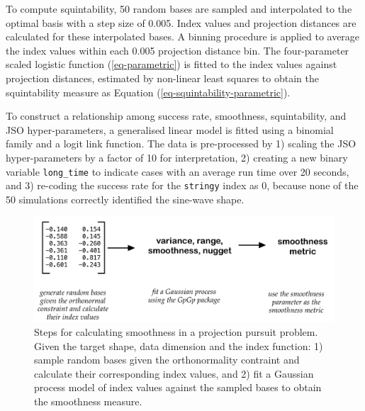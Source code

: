 \documentclass[
  12pt,
]{interact}
\theoremstyle{plain}
\begin{document}
To compute squintability, 50 random bases are sampled and interpolated
to the optimal basis with a step size of 0.005. Index values and
projection distances are calculated for these interpolated bases. A
binning procedure is applied to average the index values within each
0.005 projection distance bin. The four-parameter scaled logistic
function (\ref{eq-parametric}) is fitted to the index values against
projection distances, estimated by non-linear least squares to obtain
the squintability measure as Equation
(\ref{eq-squintability-parametric}).

To construct a relationship among success rate, smoothness,
squintability, and JSO hyper-parameters, a generalised linear model is
fitted using a binomial family and a logit link function. The data is
pre-processed by 1) scaling the JSO hyper-parameters by a factor of 10
for interpretation, 2) creating a new binary variable
\texttt{long\_time} to indicate cases with an average run time over 20
seconds, and 3) re-coding the success rate for the \texttt{stringy}
index as 0, because none of the 50 simulations correctly identified the
sine-wave shape.

\begin{figure}

{\centering \includegraphics[width=1\textwidth,height=\textheight]{figures/smoothness.png}

}

\caption{\label{fig-smoothness}Steps for calculating smoothness in a
projection pursuit problem. Given the target shape, data dimension and
the index function: 1) sample random bases given the orthonormality
contraint and calculate their corresponding index values, and 2) fit a
Gaussian process model of index values against the sampled bases to
obtain the smoothness measure.}

\end{figure}
\end{document}
